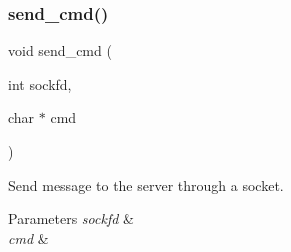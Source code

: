\mbox{\label{client_8c_a4117102389756aee8467678b28f484ed}} 
\subsubsection{send\+\_\+cmd()}
{\footnotesize\ttfamily void send\+\_\+cmd (\begin{DoxyParamCaption}\item[{int}]{sockfd,  }\item[{char $\ast$}]{cmd }\end{DoxyParamCaption})}



Send message to the server through a socket. 


\begin{DoxyParams}{Parameters}
{\em sockfd} & \\
\hline
{\em cmd} & \\
\hline
\end{DoxyParams}
